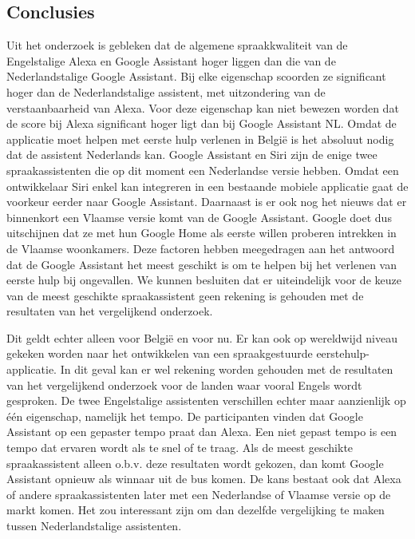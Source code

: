 \documentclass[a0,portrait]{a0poster}
\begin{document}
\begin{multicols}{2}



\color{HoGentAccent1} 
\section*{Conclusies}
\color{black}
Uit het onderzoek is gebleken dat de algemene spraakkwaliteit van de Engelstalige Alexa en Google Assistant hoger liggen dan die van de Nederlandstalige Google Assistant. Bij elke eigenschap scoorden ze significant hoger dan de Nederlandstalige assistent, met uitzondering van de verstaanbaarheid van Alexa. Voor deze eigenschap kan niet bewezen worden dat de score bij Alexa significant hoger ligt dan bij Google Assistant NL.
Omdat de applicatie moet helpen met eerste hulp verlenen in België is het absoluut nodig dat de assistent Nederlands kan. Google Assistant en Siri zijn de enige twee spraakassistenten die op dit moment een Nederlandse versie hebben. Omdat een ontwikkelaar Siri enkel kan integreren in een bestaande mobiele applicatie gaat de voorkeur eerder naar Google Assistant. Daarnaast is er ook nog het nieuws dat er binnenkort een Vlaamse versie komt van de Google Assistant. Google doet dus uitschijnen dat ze met hun Google Home als eerste willen proberen intrekken in de Vlaamse woonkamers. Deze factoren hebben meegedragen aan het antwoord dat de Google Assistant het meest geschikt is om te helpen bij het verlenen van eerste hulp bij ongevallen. We kunnen besluiten dat er uiteindelijk voor de keuze van de meest geschikte spraakassistent geen rekening is gehouden met de resultaten van het vergelijkend onderzoek.

Dit geldt echter alleen voor België en voor nu. Er kan ook op wereldwijd niveau gekeken worden naar het ontwikkelen van een spraakgestuurde eerstehulp-applicatie. In dit geval kan er wel rekening worden gehouden met de resultaten van het vergelijkend onderzoek voor de landen waar vooral Engels wordt gesproken. De twee Engelstalige assistenten verschillen echter maar aanzienlijk op één eigenschap, namelijk het tempo. De participanten vinden dat Google Assistant op een gepaster tempo praat dan Alexa. Een niet gepast tempo is een tempo dat ervaren wordt als te snel of te traag. Als de meest geschikte spraakassistent alleen o.b.v. deze resultaten wordt gekozen, dan komt Google Assistant opnieuw als winnaar uit de bus komen. De kans bestaat ook dat Alexa of andere spraakassistenten later met een Nederlandse of Vlaamse versie op de markt komen. Het zou interessant zijn om dan dezelfde vergelijking te maken tussen Nederlandstalige assistenten. 


\end{multicols}
\end{document}
